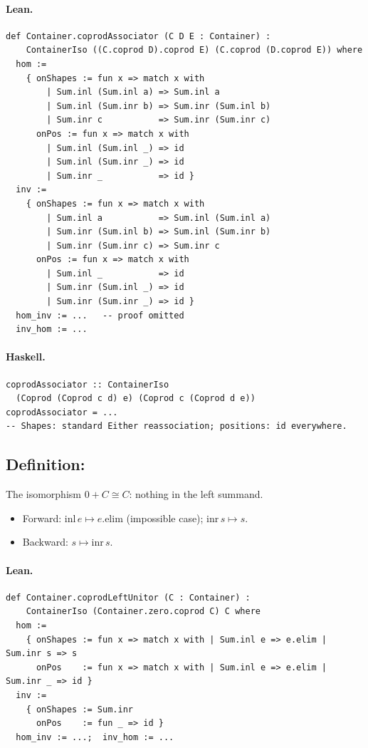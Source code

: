 \documentclass[11pt,a4paper]{article}
\begin{document}
\paragraph{Lean.}
\begin{lstlisting}[style=lean]
def Container.coprodAssociator (C D E : Container) :
    ContainerIso ((C.coprod D).coprod E) (C.coprod (D.coprod E)) where
  hom :=
    { onShapes := fun x => match x with
        | Sum.inl (Sum.inl a) => Sum.inl a
        | Sum.inl (Sum.inr b) => Sum.inr (Sum.inl b)
        | Sum.inr c           => Sum.inr (Sum.inr c)
      onPos := fun x => match x with
        | Sum.inl (Sum.inl _) => id
        | Sum.inl (Sum.inr _) => id
        | Sum.inr _           => id }
  inv :=
    { onShapes := fun x => match x with
        | Sum.inl a           => Sum.inl (Sum.inl a)
        | Sum.inr (Sum.inl b) => Sum.inl (Sum.inr b)
        | Sum.inr (Sum.inr c) => Sum.inr c
      onPos := fun x => match x with
        | Sum.inl _           => id
        | Sum.inr (Sum.inl _) => id
        | Sum.inr (Sum.inr _) => id }
  hom_inv := ...   -- proof omitted
  inv_hom := ...
\end{lstlisting}

\paragraph{Haskell.}
\begin{lstlisting}[style=haskell]
coprodAssociator :: ContainerIso
  (Coprod (Coprod c d) e) (Coprod c (Coprod d e))
coprodAssociator = ...
-- Shapes: standard Either reassociation; positions: id everywhere.
\end{lstlisting}


\subsection{Definition: }

\begin{defn}
The isomorphism $0 + C \cong C$: nothing in the left summand.
\begin{itemize}
  \item Forward: $\mathrm{inl}\,e \mapsto e.\mathrm{elim}$ (impossible case);
    $\mathrm{inr}\,s \mapsto s$.
  \item Backward: $s \mapsto \mathrm{inr}\,s$.
\end{itemize}
\end{defn}

\paragraph{Lean.}
\begin{lstlisting}[style=lean]
def Container.coprodLeftUnitor (C : Container) :
    ContainerIso (Container.zero.coprod C) C where
  hom :=
    { onShapes := fun x => match x with | Sum.inl e => e.elim | Sum.inr s => s
      onPos    := fun x => match x with | Sum.inl e => e.elim | Sum.inr _ => id }
  inv :=
    { onShapes := Sum.inr
      onPos    := fun _ => id }
  hom_inv := ...;  inv_hom := ...
\end{lstlisting}
\end{document}
